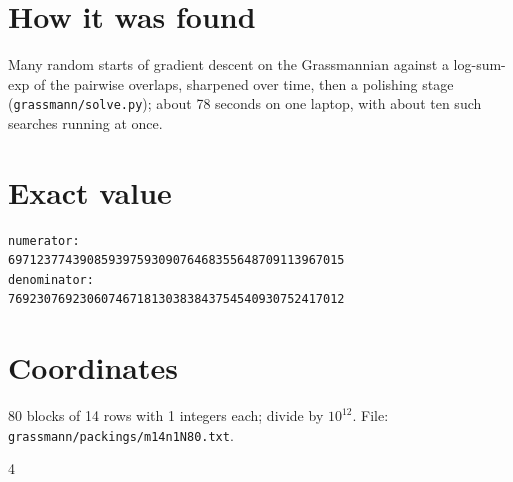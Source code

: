 \documentclass[11pt,a4paper]{article}
\begin{document}
\section{How it was found}
Many random starts of gradient descent on the Grassmannian against a log-sum-exp of the pairwise overlaps, sharpened over time, then a polishing stage (\texttt{grassmann/solve.py}); about 78 seconds on one laptop, with about ten such searches running at once.


\appendix
\section{Exact value}
{\small
\begin{verbatim}
numerator:
69712377439085939759309076468355648709113967015
denominator:
76923076923060746718130383843754540930752417012
\end{verbatim}}

\section{Coordinates}
80 blocks of 14 rows with 1 integers each; divide by $10^{12}$. File: \texttt{grassmann/packings/m14n1N80.txt}.
{\tiny
\begin{multicols}{4}
\end{multicols}}
\end{document}
